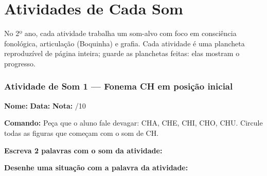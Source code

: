 
\chapter{Atividades de Cada Som}

No 2º ano, cada atividade trabalha um som-alvo com foco em consciência fonológica, articulação (Boquinha) e grafia. Cada atividade é uma plancheta reproduzível de página inteira; guarde as planchetas feitas: elas mostram o progresso.



\subsection{Atividade de Som 1 --- Fonema CH em posição inicial}
\begin{exercicio}



\noindent\textbf{Nome:} \underline{\hspace{3.2cm}} \quad \textbf{Data:} \underline{\hspace{1.6cm}} \quad \textbf{Nota:} \underline{\hspace{0.9cm}}/10


\noindent\textbf{Comando:} Peça que o aluno fale devagar: CHA, CHE, CHI, CHO, CHU. Circule todas as figuras que começam com o som de CH.


\begin{center}
\end{center}

\noindent\textbf{Escreva 2 palavras com o som da atividade:}

\begin{center}
  \underline{\hspace{3cm}} \quad \underline{\hspace{3cm}}
\end{center}

\noindent\textbf{Desenhe uma situação com a palavra da atividade:}

\begin{center}
\end{center}

\end{exercicio}

